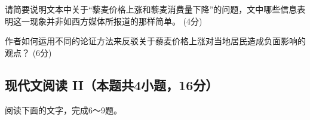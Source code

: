 \documentclass[zihao = -4]{exam-zh}
\begin{document}
       \begin{question}
         请简要说明文本中关于“藜麦价格上涨和藜麦消费量下降”的问题，文中哪些信息表明这一现象并非如西方媒体所报道的那样简单。
(4分)
       \end{question}

       \begin{question}
         作者如何运用不同的论证方法来反驳关于藜麦价格上涨对当地居民造成负面影响的观点？
(6分)
       \end{question}


       \subsection{现代文阅读 II（本题共4小题，16分）}

       阅读下面的文字，完成6～9题。
\end{document}
